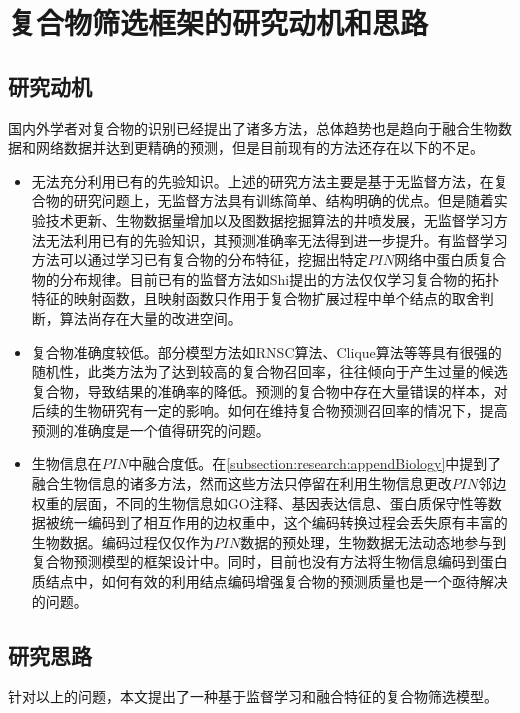 \section{复合物筛选框架的研究动机和思路}
\label{section:intro:motivationAndThinking}

\subsection{研究动机}
\label{subsection:motivationAndThinking:motivation}
国内外学者对复合物的识别已经提出了诸多方法，总体趋势也是趋向于融合生物数据和网络数据并达到更精确的预测，但是目前现有的方法还存在以下的不足。
\begin{itemize}

  \item 无法充分利用已有的先验知识。上述的研究方法主要是基于无监督方法，在复合物的研究问题上，无监督方法具有训练简单、结构明确的优点。但是随着实验技术更新、生物数据量增加以及图数据挖掘算法的井喷发展，无监督学习方法无法利用已有的先验知识，其预测准确率无法得到进一步提升。有监督学习方法可以通过学习已有复合物的分布特征，挖掘出特定$PIN$网络中蛋白质复合物的分布规律。目前已有的监督方法如Shi提出的方法\cite{shi_protein_2011}仅仅学习复合物的拓扑特征的映射函数，且映射函数只作用于复合物扩展过程中单个结点的取舍判断，算法尚存在大量的改进空间。

  \item 复合物准确度较低。部分模型方法如RNSC算法\cite{king_protein_2004}、Clique算法\cite{spirin_protein_2003}等等具有很强的随机性，此类方法为了达到较高的复合物召回率，往往倾向于产生过量的候选复合物，导致结果的准确率的降低。预测的复合物中存在大量错误的样本，对后续的生物研究有一定的影响。如何在维持复合物预测召回率的情况下，提高预测的准确度是一个值得研究的问题。

  \item 生物信息在$PIN$中融合度低。在\ref{subsection:research:appendBiology}中提到了融合生物信息的诸多方法，然而这些方法只停留在利用生物信息更改$PIN$邻边权重的层面，不同的生物信息如GO注释、基因表达信息、蛋白质保守性等数据被统一编码到了相互作用的边权重中，这个编码转换过程会丢失原有丰富的生物数据。编码过程仅仅作为$PIN$数据的预处理，生物数据无法动态地参与到复合物预测模型的框架设计中。同时，目前也没有方法将生物信息编码到蛋白质结点中，如何有效的利用结点编码增强复合物的预测质量也是一个亟待解决的问题。
\end{itemize}


\subsection{研究思路}
\label{subsection:motivationAndThinking:thinking}
针对以上的问题，本文提出了一种基于监督学习和融合特征的复合物筛选模型。

